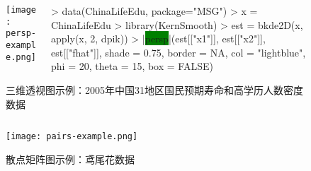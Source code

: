 \begin{frame}[c,fragile]{\subsecname}{}
\begin{figure}
 \begin{columns}
    \begin{column}[c]{.4\textwidth}
        \texttt{[image: persp-example.png]}
    \end{column}

    \begin{column}[c]{.6\textwidth}
\begin{rcode}
> data(ChinaLifeEdu, package="MSG")
> x = ChinaLifeEdu
> library(KernSmooth)
> est = bkde2D(x, apply(x, 2, dpik))
> |\colorbox{green}{persp}|(est[["x1"]], est[["x2"]], est[["fhat"]], shade = 0.75, border = NA, col = "lightblue", phi = 20, theta = 15, box = FALSE)
\end{rcode}
    \end{column}
  \end{columns}
  \caption{三维透视图示例：2005年中国31地区国民预期寿命和高学历人数密度数据}
\end{figure}
\end{frame}

\begin{frame}[c,fragile]{\subsecname}{}
\begin{figure}
 \begin{columns}
    \begin{column}[c]{.5\textwidth}
        \texttt{[image: pairs-example.png]}
    \end{column}

    \begin{column}[c]{.5\textwidth}
    \end{column}
  \end{columns}
  \caption{散点矩阵图示例：鸢尾花数据}
\end{figure}
\end{frame}

